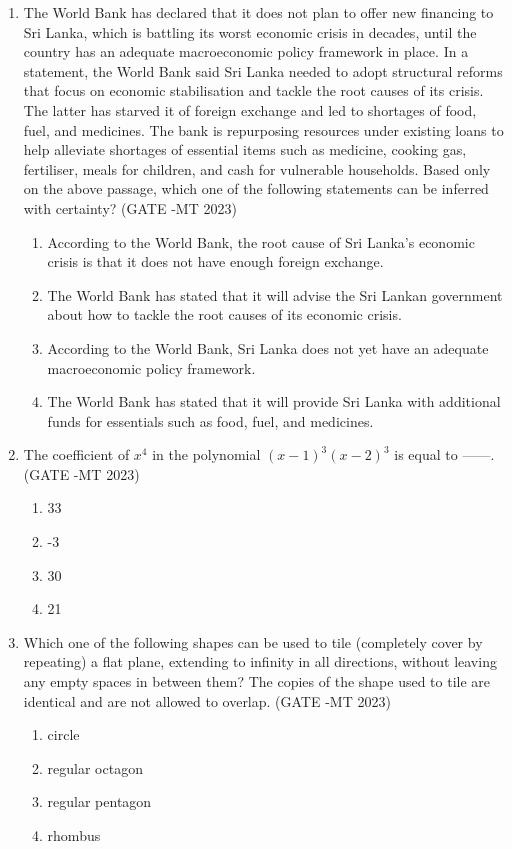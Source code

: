 \documentclass[12pt]{article}
\begin{document}
\begin{enumerate}
\item The World Bank has declared that it does not plan to offer new financing to Sri Lanka, which is battling its worst economic crisis in decades, until the country has an adequate macroeconomic policy framework in place. In a statement, the World Bank said Sri Lanka needed to adopt structural reforms that focus on economic stabilisation and tackle the root causes of its crisis. The latter has starved it of foreign exchange and led to shortages of food, fuel, and medicines. The bank is repurposing resources under existing loans to help alleviate shortages of essential items such as medicine, cooking gas, fertiliser, meals for children, and cash for vulnerable households.
Based only on the above passage, which one of the following statements can be inferred with certainty? (GATE -MT 2023)
\begin{enumerate}[label=(\alph*)]
  \item According to the World Bank, the root cause of Sri Lanka’s economic crisis is that it does not have enough foreign exchange.
  \item The World Bank has stated that it will advise the Sri Lankan government about how to tackle the root causes of its economic crisis.
  \item According to the World Bank, Sri Lanka does not yet have an adequate macroeconomic policy framework.
  \item The World Bank has stated that it will provide Sri Lanka with additional funds for essentials such as food, fuel, and medicines.
\end{enumerate}

\item The coefficient of \(x^4\) in the polynomial \((x-1)^3 (x-2)^3\) is equal to ------.  (GATE -MT 2023)
\begin{enumerate}[label=(\alph*)]
  \item 33
  \item -3
  \item 30
  \item 21
\end{enumerate}

\item Which one of the following shapes can be used to tile (completely cover by repeating) a flat plane, extending to infinity in all directions, without leaving any empty spaces in between them? The copies of the shape used to tile are identical and are not allowed to overlap. (GATE -MT 2023)
\begin{enumerate}[label=(\alph*)]
  \item circle
  \item regular octagon
  \item regular pentagon
  \item rhombus
\end{enumerate}


\end{enumerate}
\end{document}
